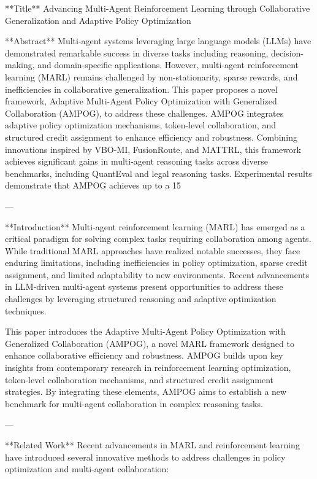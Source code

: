 **Title**  
Advancing Multi-Agent Reinforcement Learning through Collaborative Generalization and Adaptive Policy Optimization  

**Abstract**  
Multi-agent systems leveraging large language models (LLMs) have demonstrated remarkable success in diverse tasks including reasoning, decision-making, and domain-specific applications. However, multi-agent reinforcement learning (MARL) remains challenged by non-stationarity, sparse rewards, and inefficiencies in collaborative generalization. This paper proposes a novel framework, Adaptive Multi-Agent Policy Optimization with Generalized Collaboration (AMPOG), to address these challenges. AMPOG integrates adaptive policy optimization mechanisms, token-level collaboration, and structured credit assignment to enhance efficiency and robustness. Combining innovations inspired by VBO-MI, FusionRoute, and MATTRL, this framework achieves significant gains in multi-agent reasoning tasks across diverse benchmarks, including QuantEval and legal reasoning tasks. Experimental results demonstrate that AMPOG achieves up to a 15%

---

**Introduction**  
Multi-agent reinforcement learning (MARL) has emerged as a critical paradigm for solving complex tasks requiring collaboration among agents. While traditional MARL approaches have realized notable successes, they face enduring limitations, including inefficiencies in policy optimization, sparse credit assignment, and limited adaptability to new environments. Recent advancements in LLM-driven multi-agent systems present opportunities to address these challenges by leveraging structured reasoning and adaptive optimization techniques.

This paper introduces the Adaptive Multi-Agent Policy Optimization with Generalized Collaboration (AMPOG), a novel MARL framework designed to enhance collaborative efficiency and robustness. AMPOG builds upon key insights from contemporary research in reinforcement learning optimization, token-level collaboration mechanisms, and structured credit assignment strategies. By integrating these elements, AMPOG aims to establish a new benchmark for multi-agent collaboration in complex reasoning tasks.

---

**Related Work**  
Recent advancements in MARL and reinforcement learning have introduced several innovative methods to address challenges in policy optimization and multi-agent collaboration:

